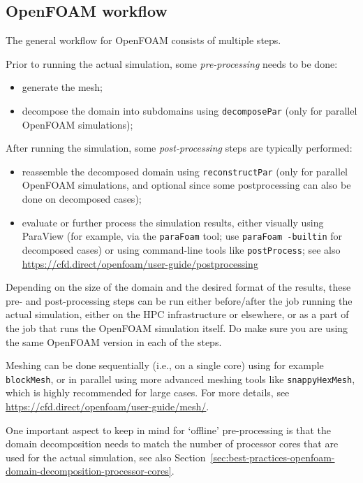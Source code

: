 \subsection{OpenFOAM workflow}

The general workflow for OpenFOAM consists of multiple steps.

Prior to running the actual simulation, some \textit{pre-processing} needs to be done:

\begin{itemize}
\item generate the mesh;
\item decompose the domain into subdomains using {\small\texttt{decomposePar}} (only for parallel OpenFOAM simulations);
\end{itemize}

After running the simulation, some \textit{post-processing} steps are typically performed:

\begin{itemize}
\item reassemble the decomposed domain using {\small\texttt{reconstructPar}} (only for parallel OpenFOAM simulations,
      and optional since some postprocessing can also be done on decomposed cases);
\item evaluate or further process the simulation results, either visually using ParaView
      (for example, via the {\small\texttt{paraFoam}} tool; use {\small\texttt{paraFoam -builtin}} for decomposed cases)
      or using command-line tools like {\small\texttt{postProcess}};
      see also {\small\url{https://cfd.direct/openfoam/user-guide/postprocessing}}

\end{itemize}

Depending on the size of the domain and the desired format of the results, these pre- and post-processing
steps can be run either before/after the job running the actual simulation, either on the HPC infrastructure
or elsewhere, or as a part of the job that runs the OpenFOAM simulation itself.
Do make sure you are using the same OpenFOAM version in each of the steps.

Meshing can be done sequentially (i.e., on a single core) using for example {\small\texttt{blockMesh}},
or in parallel using more advanced meshing tools like {\small\texttt{snappyHexMesh}}, which is highly recommended
for large cases. For more details, see \url{https://cfd.direct/openfoam/user-guide/mesh/}.

One important aspect to keep in mind for `offline' pre-processing is that the domain decomposition needs to match
the number of processor cores that are used for the actual simulation,
see also Section~\ref{sec:best-practices-openfoam-domain-decomposition-processor-cores}.

